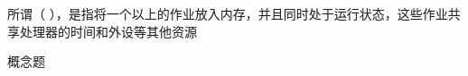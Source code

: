 \question 所谓（
），是指将一个以上的作业放入内存，并且同时处于运行状态，这些作业共享处理器的时间和外设等其他资源
\par{}
\begin{solution}概念题
\end{solution}
